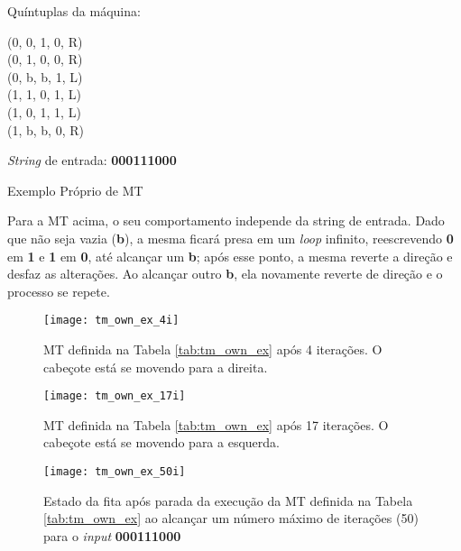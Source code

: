 \begin{table}[H]
    \begin{minipage}{0.6\linewidth}

        \begin{minipage}{0.55\linewidth}
                Quíntuplas da máquina:
        \end{minipage}%
        \begin{minipage}{0.45\linewidth}
            \ttfamily
            (0, 0, 1, 0, R) \\
            (0, 1, 0, 0, R) \\
            (0, b, b, 1, L) \\
            (1, 1, 0, 1, L) \\
            (1, 0, 1, 1, L) \\
            (1, b, b, 0, R)
        \end{minipage}

    \end{minipage}%
    \begin{minipage}{0.4\linewidth}

        \begin{flushright}
            \textit{String} de entrada: \textbf{000111000}
        \end{flushright}

    \end{minipage}

    \caption{Exemplo Próprio de MT}
    \label{tab:tm_own_ex}
\end{table}

Para a MT acima, o seu comportamento independe da string de entrada. Dado que
não seja vazia (\textbf{b}), a mesma ficará presa em um \textit{loop} infinito,
reescrevendo \textbf{0} em \textbf{1} e \textbf{1} em \textbf{0}, até alcançar
um \textbf{b}; após esse ponto, a mesma reverte a direção e desfaz as
alterações. Ao alcançar outro \textbf{b}, ela novamente reverte de direção e
o processo se repete.

\begin{figure}[H]
    \centering
    \texttt{[image: tm\_own\_ex\_4i]}
    \caption{
        MT definida na Tabela \ref{tab:tm_own_ex} após 4 iterações. O cabeçote
        está se movendo para a direita.
    }
    \label{fig:tm_own_ex_4i}
\end{figure}

\begin{figure}[H]
    \centering
    \texttt{[image: tm\_own\_ex\_17i]}
    \caption{
        MT definida na Tabela \ref{tab:tm_own_ex} após 17 iterações. O cabeçote
        está se movendo para a esquerda.
    }
    \label{fig:tm_own_ex_17i}
\end{figure}

\begin{figure}[H]
    \centering
    \texttt{[image: tm\_own\_ex\_50i]}
    \caption{
        Estado da fita após parada da execução da MT definida na
        Tabela \ref{tab:tm_own_ex} ao alcançar um número máximo de iterações
        (50) para o \textit{input} \textbf{000111000}
    }
    \label{fig:tm_own_ex_50i}
\end{figure}